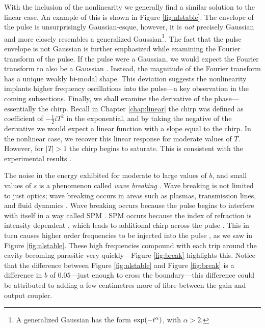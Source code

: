 \documentclass[10pt,twocolumn,a4paper]{article}
\let\originalleft\left
\let\originalright\right
\renewcommand{\left}{\mathopen{}\mathclose\bgroup\originalleft}
\renewcommand{\right}{\aftergroup\egroup\originalright}
\begin{document}
With the inclusion of the nonlinearity we generally find a similar solution to the linear case. An example of this is shown in Figure \ref{fig:nlstable}. The envelope of the pulse is unsurprisingly Gaussian-esque, however, it is \emph{not} precisely Gaussian and more closely resembles a generalized Gaussian\footnote{A generalized Gaussian has the form $\exp \left(-t^\alpha \right)$, with $\alpha > 2$.}. The fact that the pulse envelope is not Gaussian is further emphasized while examining the Fourier transform of the pulse. If the pulse were a Gaussian, we would expect the Fourier transform to also be a Gaussian \cite{debnath, gradshteyn}. Instead, the magnitude of the Fourier transform has a unique weakly bi-modal shape. This deviation suggests the nonlinearity implants higher frequency oscillations into the pulse---a key observation in the coming subsections. Finally, we shall examine the derivative of the phase---essentially the chirp. Recall in Chapter \ref{chap:linear} the chirp was defined as coefficient of $-\frac{1}{2}iT^2$ in the exponential, and by taking the negative of the derivative we would expect a linear function with a slope equal to the chirp. In the nonlinear case, we recover this linear response for moderate values of $T$. However, for $|T| > 1$ the chirp begins to saturate. This is consistent with the experimental results \cite{chen, rothenberg, tomlinson}.




The noise in the energy exhibited for moderate to large values of $b$, and small values of $s$ is a phenomenon called \emph{wave breaking} \cite{agrawal2013, anderson, finot, rothenberg, tomlinson}. Wave breaking is not limited to just optics; wave breaking occurs in areas such as plasmas, transmission lines, and fluid dynamics \cite{rothenberg}. Wave breaking occurs because the pulse begins to interfere with itself in a way called SPM \cite{agrawal2002, agrawal2013, becker}. SPM occurs because the index of refraction is intensity dependent \cite{agrawal2002, becker, rothenberg, silfvast}, which leads to additional chirp across the pulse \cite{agrawal2013, anderson, rothenberg, silfvast}. This in turn causes higher order frequencies to be injected into the pulse \cite{agrawal2013, anderson}, as we saw in Figure \ref{fig:nlstable}. These high frequencies compound with each trip around the cavity becoming parasitic very quickly---Figure \ref{fig:break} highlights this. Notice that the difference between Figure \ref{fig:nlstable} and Figure \ref{fig:break} is a difference in $b$ of $0.05$---just enough to cross the boundary---this difference could be attributed to adding a few centimetres more of fibre between the gain and output coupler. \\
\end{document}
